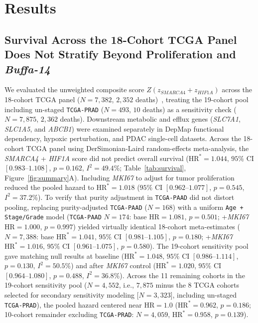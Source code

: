 \documentclass[11pt]{article}
\begin{document}
\section{Results}

\subsection{Survival Across the 18-Cohort TCGA Panel Does Not Stratify Beyond Proliferation and \textit{Buffa-14}}
We evaluated the unweighted composite score $Z(z_{\textit{SMARCA4}} + z_{\textit{HIF1A}})$ across the 18-cohort TCGA panel ($N = 7,382$, $2,352$ deaths)~\cite{tcga2018}, treating the 19-cohort pool including un-staged \texttt{TCGA-PRAD} ($N = 493$, $10$ deaths) as a sensitivity check ($N = 7,875$, $2,362$ deaths). Downstream metabolic and efflux genes (\textit{SLC7A1}, \textit{SLC1A5}, and \textit{ABCB1}) were examined separately in DepMap functional dependency, hypoxic perturbation, and PDAC single-cell datasets. Across the 18-cohort TCGA panel using DerSimonian-Laird random-effects meta-analysis, the \textit{SMARCA4} + \textit{HIF1A} score did not predict overall survival ($\text{HR}^* = 1.044$, $95\%$ CI $[0.983\text{--}1.108]$, $p = 0.162$, $I^2 = 49.4\%$; Table~\ref{tab:survival}, Figure~\ref{fig:summary}A). Including \textit{MKI67} to adjust for tumor proliferation reduced the pooled hazard to $\text{HR}^* = 1.018$ ($95\%$ CI $[0.962\text{--}1.077]$, $p = 0.545$, $I^2 = 37.2\%$). To verify that purity adjustment in \texttt{TCGA-PAAD} did not distort pooling, replacing purity-adjusted \texttt{TCGA-PAAD} ($N = 168$) with a uniform \texttt{Age + Stage/Grade} model (\texttt{TCGA-PAAD} $N = 174$: base $\text{HR} = 1.081$, $p = 0.501$; +\textit{MKI67} $\text{HR} = 1.000$, $p = 0.997$) yielded virtually identical 18-cohort meta-estimates ($N = 7,388$: base $\text{HR}^* = 1.041$, $95\%$ CI $[0.981\text{--}1.105]$, $p = 0.180$; +\textit{MKI67} $\text{HR}^* = 1.016$, $95\%$ CI $[0.961\text{--}1.075]$, $p = 0.580$). The 19-cohort sensitivity pool gave matching null results at baseline ($\text{HR}^* = 1.048$, $95\%$ CI $[0.986\text{--}1.114]$, $p = 0.130$, $I^2 = 50.5\%$) and after \textit{MKI67} control ($\text{HR}^* = 1.020$, $95\%$ CI $[0.964\text{--}1.080]$, $p = 0.488$, $I^2 = 36.8\%$). Across the 11 remaining cohorts in the 19-cohort sensitivity pool ($N = 4,552$, i.e., $7,875$ minus the 8 TCGA cohorts selected for secondary sensitivity modeling [$N = 3,323$], including un-staged \texttt{TCGA-PRAD}), the pooled hazard centered near $\text{HR} = 1.0$ ($\text{HR}^* = 0.962$, $p = 0.186$; 10-cohort remainder excluding \texttt{TCGA-PRAD}: $N = 4,059$, $\text{HR}^* = 0.958$, $p = 0.139$).
\end{document}
